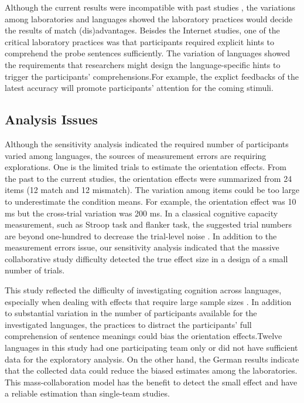 \documentclass[
  man,floatsintext]{apa6}
\begin{document}
Although the current results were incompatible with past studies \autocite[i.e.][]{chenDoesObjectSize2020}, the variations among laboratories and languages showed the laboratory practices would decide the results of match (dis)advantages. Beisdes the Internet studies, one of the critical laboratory practices was that participants required explicit hints to comprehend the probe sentences sufficiently. The variation of languages showed the requirements that researchers might design the language-specific hints to trigger the participants' comprehensions.For example, the explict feedbacks of the latest accuracy will promote participants' attention for the coming stimuli.

\hypertarget{analysis-issues}{%
\subsection{Analysis Issues}\label{analysis-issues}}

Although the sensitivity analysis indicated the required number of participants varied among languages, the sources of measurement errors are requiring explorations. One is the limited trials to estimate the orientation effects. From the past to the current studies, the orientation effects were summarized from 24 items (12 match and 12 mismatch). The variation among items could be too large to underestimate the condition means. For example, the orientation effect was 10 ms but the cross-trial variation was 200 ms. In a classical cognitive capacity measurement, such as Stroop task and flanker task, the suggested trial numbers are beyond one-hundred to decrease the trial-level noise \autocite{rouderWhyMostStudies2019}. In addition to the measurement errors issue, our sensitivity analysis indicated that the massive collaborative study difficulty detected the true effect size in a design of a small number of trials.

This study reflected the difficulty of investigating cognition across languages, especially when dealing with effects that require large sample sizes \autocites[see][]{lokenMeasurementErrorReplication2017,vadilloUnderpoweredSamplesFalse2016}. In addition to substantial variation in the number of participants available for the investigated languages, the practices to distract the participants' full comprehension of sentence meanings could bias the orientation effects.Twelve languages in this study had one participating team only or did not have sufficient data for the exploratory analysis. On the other hand, the German results indicate that the collected data could reduce the biased estimates among the laboratories. This mass-collaboration model has the benefit to detect the small effect and have a reliable estimation than single-team studies.
\end{document}
